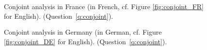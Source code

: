 \begin{figure}[h!]
    \caption[Conjoint analysis in France (French)]{Conjoint analysis in France (in French, cf. Figure \ref{fig:conjoint_FR} for English). \hfill (Question~\ref{q:conjoint}).
    }\label{fig:conjoint_FR_original}
\end{figure}

\begin{figure}[h!]
    \caption[Conjoint analysis in Germany (German)]{Conjoint analysis in Germany (in German, cf. Figure \ref{fig:conjoint_DE} for English). \hfill (Question~\ref{q:conjoint}).
    }\label{fig:conjoint_DE_original}
\end{figure}

